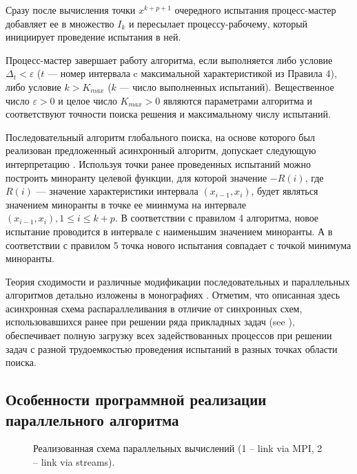 \documentclass[mathematics,article,submit,pdftex,moreauthors]{Definitions/mdpi}
\begin{document}
Сразу после вычисления точки $x^{k+p+1}$ очередного испытания процесс-мастер добавляет ее в множество $I_k$ и пересылает процессу-рабочему, который инициирует проведение испытания в ней. 

Процесс-мастер завершает работу алгоритма, если выполняется либо условие $\Delta_{t}<\varepsilon$ ($t$ --- номер интервала c максимальной характеристикой из Правила 4), либо условие $k>K_{max}$ ($k$ --- число выполненных испытаний).
Вещественное число $\varepsilon>0$ и целое число $K_{max}>0$ являются параметрами алгоритма и соответствуют точности поиска решения и максимальному числу испытаний.

Последовательный алгоритм глобального поиска, на основе которого был реализован предложенный асинхронный алгоритм, допускает следующую интерпретацию \cite{Molinaro2001}. Используя точки ранее проведенных испытаний можно построить миноранту целевой функции, для которой значение $-R(i)$, где $R(i)$ --- значение характеристики интервала $(x_{i-1},x_i)$, будет являться значением миноранты в точке ее миинмума на интервале $(x_{i-1},x_i), 1\leq i\leq k+p$. В соответствии с правилом 4 алгоритма, новое испытание проводится в интервале с наименьшим значением миноранты. А в соответствии с правилом 5 точка нового испытания совпадает с точкой минимума миноранты.

Теория сходимости и различные модификации последовательных и параллельных алгоритмов детально изложены в монографиях \cite{Strongin2000,Sergeyev2017}. 
Отметим, что описанная здесь асинхронная схема распараллеливания в отличие от синхронных схем, использовавшихся ранее при решении ряда прикладных задач (see \cite{Kalyulin2017,Modorskii2016}), обеспечивает полную загрузку всех задействованных процессов при решении задач с разной трудоемкостью проведения испытаний в разных точках области поиска.



\subsection{Особенности программной реализации параллельного алгоритма}

\begin{figure}
\caption{Реализованная схема параллельных вычислений (1 -- link via MPI, 2 -- link via streams).}\label{fig:Impl}
\end{figure}   
\end{document}
